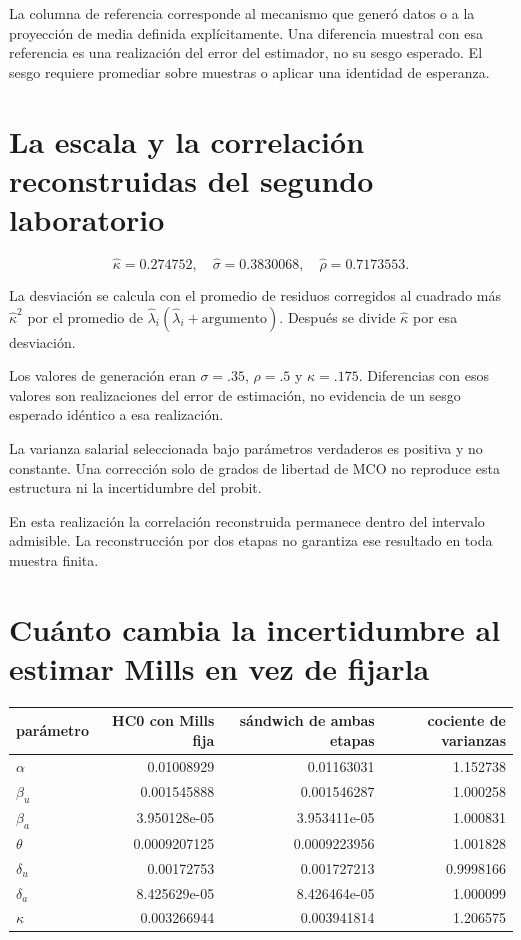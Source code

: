 \documentclass[11pt,a4paper]{article}
\begin{document}
La columna de referencia corresponde al mecanismo que generó datos o a la proyección de media definida explícitamente. Una diferencia muestral con esa referencia es una realización del error del estimador, no su sesgo esperado. El sesgo requiere promediar sobre muestras o aplicar una identidad de esperanza.

\clearpage
\section{La escala y la correlación reconstruidas del segundo laboratorio}

\[
\widehat\kappa=0.274752,\quad
\widehat\sigma=0.3830068,\quad
\widehat\rho=0.7173553.
\]

La desviación se calcula con el promedio de residuos corregidos al cuadrado más $\widehat\kappa^2$ por el promedio de $\widehat\lambda_i(\widehat\lambda_i+\text{argumento})$. Después se divide $\widehat\kappa$ por esa desviación.

Los valores de generación eran $\sigma=.35$, $\rho=.5$ y $\kappa=.175$. Diferencias con esos valores son realizaciones del error de estimación, no evidencia de un sesgo esperado idéntico a esa realización.

La varianza salarial seleccionada bajo parámetros verdaderos es positiva y no constante. Una corrección solo de grados de libertad de MCO no reproduce esta estructura ni la incertidumbre del probit.

En esta realización la correlación reconstruida permanece dentro del intervalo admisible. La reconstrucción por dos etapas no garantiza ese resultado en toda muestra finita.

\clearpage
\section{Cuánto cambia la incertidumbre al estimar Mills en vez de fijarla}

\begin{center}\small
\begin{tabular}{lrrr}
\toprule
parámetro & HC0 con Mills fija & sándwich de ambas etapas & cociente de varianzas\\\midrule
$\alpha$ & 0.01008929 & 0.01163031 & 1.152738\\
$\beta_u$ & 0.001545888 & 0.001546287 & 1.000258\\
$\beta_a$ & 3.950128e-05 & 3.953411e-05 & 1.000831\\
$\theta$ & 0.0009207125 & 0.0009223956 & 1.001828\\
$\delta_u$ & 0.00172753 & 0.001727213 & 0.9998166\\
$\delta_a$ & 8.425629e-05 & 8.426464e-05 & 1.000099\\
$\kappa$ & 0.003266944 & 0.003941814 & 1.206575\\
\bottomrule
\end{tabular}\end{center}
\end{document}
